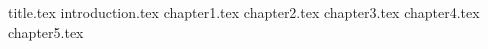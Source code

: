 \documentclass[a4paper,14pt]{extarticle}
\begin{document}
	 {title.tex}
	\clearpage
	\setcounter{page}{2}
	\tableofcontents
	\clearpage
	 {introduction.tex}
	\clearpage
	 {chapter1.tex}
	\clearpage
	 {chapter2.tex}
	\clearpage
	 {chapter3.tex}
	\clearpage
            {chapter4.tex}
	\clearpage
            {chapter5.tex}
	\clearpage
	\renewcommand{\refname}{Список использованных источников}
	
           
\end{document}

